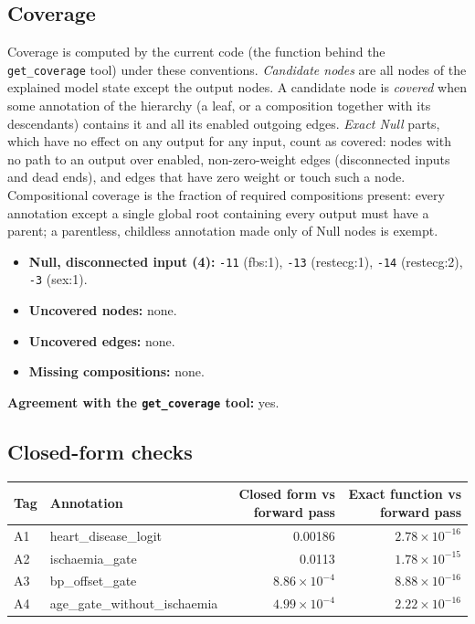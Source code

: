 \begin{drafted}
\subsection{Coverage}\label{app:heart-s5-c1:coverage}
Coverage is computed by the current code (the function behind the \texttt{get\_coverage} tool) under these conventions. \emph{Candidate nodes} are all nodes of the explained model state except the output nodes. A candidate node is \emph{covered} when some annotation of the hierarchy (a leaf, or a composition together with its descendants) contains it and all its enabled outgoing edges. \emph{Exact Null} parts, which have no effect on any output for any input, count as covered: nodes with no path to an output over enabled, non-zero-weight edges (disconnected inputs and dead ends), and edges that have zero weight or touch such a node. Compositional coverage is the fraction of required compositions present: every annotation except a single global root containing every output must have a parent; a parentless, childless annotation made only of Null nodes is exempt.

\begin{itemize}
\item \textbf{Null, disconnected input (4):} \texttt{-11} (fbs:1), \texttt{-13} (restecg:1), \texttt{-14} (restecg:2), \texttt{-3} (sex:1).
\item \textbf{Uncovered nodes:} none.
\item \textbf{Uncovered edges:} none.
\item \textbf{Missing compositions:} none.
\end{itemize}
\noindent\textbf{Agreement with the \texttt{get\_coverage} tool:} yes.

\subsection{Closed-form checks}\label{app:heart-s5-c1:closedform}
{\small\noindent\begin{tabularx}{\linewidth}{@{}lXrr@{}}
\toprule Tag & Annotation & Closed form vs forward pass & Exact function vs forward pass \\ \midrule
A1 & heart\_\allowbreak{}disease\_\allowbreak{}logit & 0.00186 & $2.78\times 10^{-16}$ \\
A2 & ischaemia\_\allowbreak{}gate & 0.0113 & $1.78\times 10^{-15}$ \\
A3 & bp\_\allowbreak{}offset\_\allowbreak{}gate & $8.86\times 10^{-4}$ & $8.88\times 10^{-16}$ \\
A4 & age\_\allowbreak{}gate\_\allowbreak{}without\_\allowbreak{}ischaemia & $4.99\times 10^{-4}$ & $2.22\times 10^{-16}$ \\
\bottomrule
\end{tabularx}\par}

\end{drafted}
